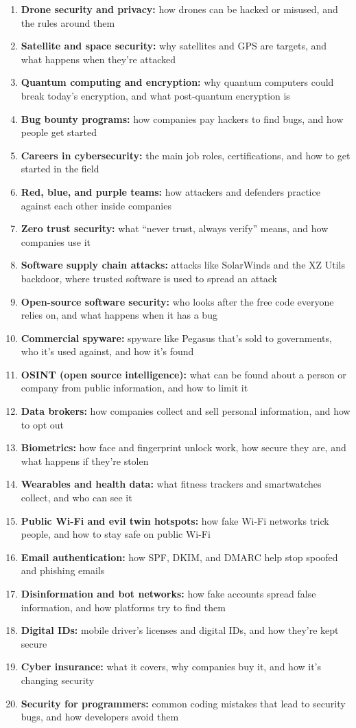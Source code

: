 \documentclass[12pt]{article}
\begin{document}
\begin{enumerate}
    \item \textbf{Drone security and privacy:} how drones can be hacked or misused, and the rules around them
    \item \textbf{Satellite and space security:} why satellites and GPS are targets, and what happens when they're attacked
    \item \textbf{Quantum computing and encryption:} why quantum computers could break today's encryption, and what post-quantum encryption is
    \item \textbf{Bug bounty programs:} how companies pay hackers to find bugs, and how people get started
    \item \textbf{Careers in cybersecurity:} the main job roles, certifications, and how to get started in the field
    \item \textbf{Red, blue, and purple teams:} how attackers and defenders practice against each other inside companies
    \item \textbf{Zero trust security:} what ``never trust, always verify'' means, and how companies use it
    \item \textbf{Software supply chain attacks:} attacks like SolarWinds and the XZ Utils backdoor, where trusted software is used to spread an attack
    \item \textbf{Open-source software security:} who looks after the free code everyone relies on, and what happens when it has a bug
    \item \textbf{Commercial spyware:} spyware like Pegasus that's sold to governments, who it's used against, and how it's found
    \item \textbf{OSINT (open source intelligence):} what can be found about a person or company from public information, and how to limit it
    \item \textbf{Data brokers:} how companies collect and sell personal information, and how to opt out
    \item \textbf{Biometrics:} how face and fingerprint unlock work, how secure they are, and what happens if they're stolen
    \item \textbf{Wearables and health data:} what fitness trackers and smartwatches collect, and who can see it
    \item \textbf{Public Wi-Fi and evil twin hotspots:} how fake Wi-Fi networks trick people, and how to stay safe on public Wi-Fi
    \item \textbf{Email authentication:} how SPF, DKIM, and DMARC help stop spoofed and phishing emails
    \item \textbf{Disinformation and bot networks:} how fake accounts spread false information, and how platforms try to find them
    \item \textbf{Digital IDs:} mobile driver's licenses and digital IDs, and how they're kept secure
    \item \textbf{Cyber insurance:} what it covers, why companies buy it, and how it's changing security
    \item \textbf{Security for programmers:} common coding mistakes that lead to security bugs, and how developers avoid them
\end{enumerate}
\end{document}
